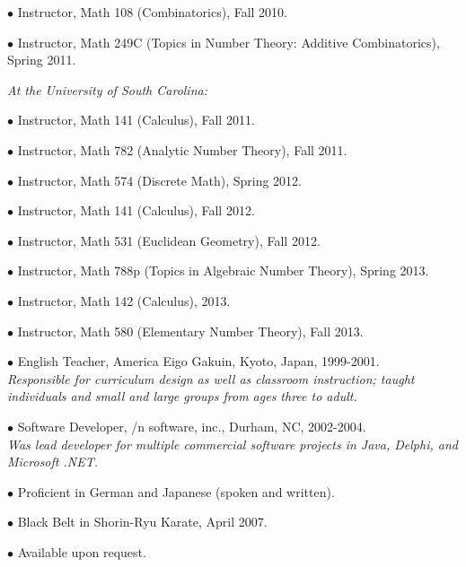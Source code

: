 \documentclass{article}
\newcommand{\categorywidth}{1in}        %
\newcommand{\infowidth}{5.8in}          %
\newcommand{\categorysep}{5pt}
\newcommand{\catlistlabel}[1]%
{\raisebox{0pt}[1ex][0pt]{\makebox[\labelwidth][l]%
    {\parbox[t]{\labelwidth}{\hspace{0pt}\textbf{#1}}}}}
\newenvironment{categories}{\begin{list}{}{
      \setlength{\labelwidth}{\categorywidth}
      \setlength{\leftmargin}{\labelwidth}
      \addtolength{\leftmargin}{\labelsep}
      \setlength{\topsep}{20pt}
      \setlength{\itemsep}{\categorysep}
      \renewcommand{\makelabel}{\catlistlabel}
      }}{\end{list}}
\newcommand{\category}[1]{\item[#1]}
\newcommand{\rawentry}[1]{{\begin{minipage}[t]{\infowidth}{#1}
    \end{minipage}}}
\begin{document}
\begin{flushleft}
\begin{categories}
  $\bullet$ {Instructor, Math 108 (Combinatorics), Fall 2010.}

  $\bullet$ {Instructor, Math 249C (Topics in Number Theory: Additive Combinatorics), Spring 2011.}

  \rawentry{\itshape At the University of South Carolina:}

  $\bullet$ {Instructor, Math 141 (Calculus), Fall 2011.}

  $\bullet$ {Instructor, Math 782 (Analytic Number Theory), Fall 2011.}

  $\bullet$ {Instructor, Math 574 (Discrete Math), Spring 2012.}

  $\bullet$ {Instructor, Math 141 (Calculus), Fall 2012.}

  $\bullet$ {Instructor, Math 531 (Euclidean Geometry), Fall 2012.}

  $\bullet$ {Instructor, Math 788p (Topics in Algebraic Number Theory), Spring 2013.}

  $\bullet$ {Instructor, Math 142 (Calculus), 2013.}

  $\bullet$ {Instructor, Math 580 (Elementary Number Theory), Fall 2013.}

  \category{Non-Academic \\ Employment}
  
  $\bullet$ {English Teacher, America Eigo Gakuin, Kyoto, Japan, 1999-2001. \\
  \itshape Responsible for curriculum design as well as classroom instruction;
taught individuals and small and large groups from ages three to adult. \upshape}

  $\bullet$ {Software Developer, /n software, inc., Durham, NC, 2002-2004. \\
  \itshape Was lead developer for multiple commercial software projects in
Java, Delphi, and Microsoft .NET. \upshape}

  \category{Personal}

  $\bullet$ {Proficient in German and Japanese (spoken and written).}

  $\bullet$ {Black Belt in Shorin-Ryu Karate, April 2007.}

  \category{References}
 
  $\bullet$ {Available upon request.}

\end{categories}



\end{flushleft}
\end{document}
